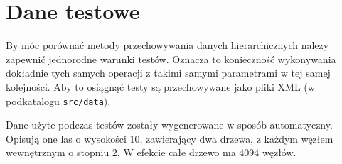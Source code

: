 


% 



\section*{Dane testowe}

By móc porównać metody przechowywania danych hierarchicznych należy zapewnić jednorodne warunki testów.
Oznacza to konieczność wykonywania dokładnie tych samych operacji z takimi samymi parametrami w tej samej kolejności.
Aby to osiągnąć testy są przechowywane jako pliki XML (w podkatalogu \verb|src/data|).


Dane użyte podczas testów zostały wygenerowane w sposób automatyczny.
Opisują one las o wysokości $10$, zawierający dwa drzewa, 
z każdym węzłem wewnętrznym o stopniu $2$.
W efekcie całe drzewo ma $4094$ węzłów.



